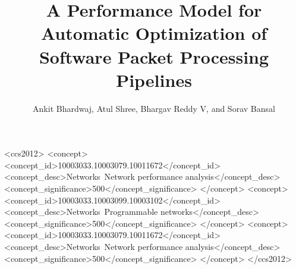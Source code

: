\documentclass[sigconf]{acmart}
\begin{document}
\title{A Performance Model for Automatic Optimization of Software Packet Processing Pipelines}

\author{Ankit Bhardwaj,  Atul Shree, Bhargav Reddy V, and Sorav Bansal}


%
%
\begin{CCSXML}
<ccs2012>
<concept>
<concept_id>10003033.10003079.10011672</concept_id>
<concept_desc>Networks~Network performance analysis</concept_desc>
<concept_significance>500</concept_significance>
</concept>
<concept>
<concept_id>10003033.10003099.10003102</concept_id>
<concept_desc>Networks~Programmable networks</concept_desc>
<concept_significance>500</concept_significance>
</concept>
<concept>
<concept_id>10003033.10003079.10011672</concept_id>
<concept_desc>Networks~Network performance analysis</concept_desc>
<concept_significance>500</concept_significance>
</concept>
</ccs2012>
\end{CCSXML}


\maketitle






\end{document}
